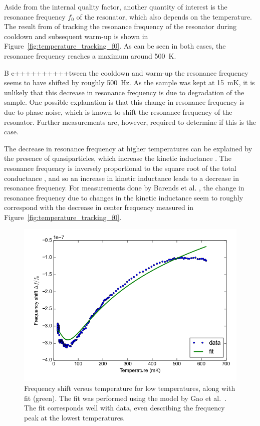 \documentclass[12pt]{report}
\begin{document}
Aside from the internal quality factor, another quantity of interest is the resonance frequency $f_0$ of the resonator, which also depends on the temperature. The result from of tracking the resonance frequency of the resonator during cooldown and subsequent warm-up is shown in Figure~\ref{fig:temperature_tracking_f0}. As can be seen in both cases, the resonance frequency reaches a maximum around \SI{500}{\kelvin}.

B
e++++++++++tween the cooldown and warm-up the resonance frequency seems to have shifted by roughly \SI{500}{Hz}. As the sample was kept at \SI{15}{\milli \kelvin}, it is unlikely that this decrease in resonance frequency is due to degradation of the sample. One possible explanation is that this change in resonance frequency is due to phase noise, which is known to shift the resonance frequency of the resonator. Further measurements are, however, required to determine if this is the case.

The decrease in resonance frequency at higher temperatures can be explained by the presence of quasiparticles, which increase the kinetic inductance \cite[p.~91]{Geerlings}. The resonance frequency is inversely proportional to the square root of the total conductance \cite{barends2008contribution}, and so an increase in kinetic inductance leads to a decrease in resonance frequency. For measurements done by Barends et al. \cite{barends2008contribution}, the change in resonance frequency due to changes in the kinetic inductance seem to roughly correspond with the decrease in center frequency measured in Figure~\ref{fig:temperature_tracking_f0}.

\begin{figure}[h]
    \centering
    \includegraphics[width=.7\textwidth]{Figures/Temperature increase tracking - f0 vs T with fit.png}
    \caption{Frequency shift versus temperature for low temperatures, along with fit (green). The fit was performed using the model by Gao et al.~\cite{gao2008experimental}. The fit corresponds well with data, even describing the frequency peak at the lowest temperatures.}
    \label{fig:f0_vs_T_with_fit}
\end{figure}
\end{document}
